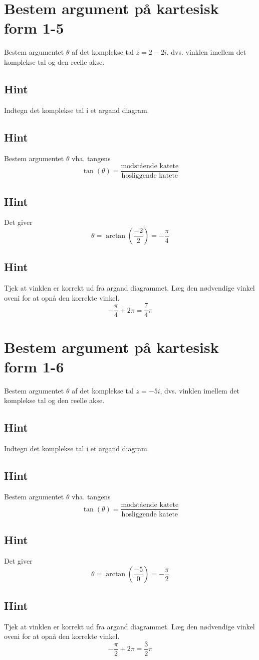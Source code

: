 \documentclass{article}
\newenvironment{exercise}[1]{\newpage\section{#1}}{}
\newcommand{\answerbox}[1]{\fbox{$#1$}}
\newcommand{\hint}{\subsection*{Hint}}
\begin{document}
\begin{exercise}{Bestem argument på kartesisk form 1-5}
	
	Bestem argumentet $\theta$ af det komplekse tal $z=2-2i$, dvs. vinklen imellem det komplekse tal og den reelle akse.
	
	\answerbox{ \frac{7}{4} \pi}
	
	
	\hint 
	
	Indtegn det komplekse tal i et argand diagram.
	
	
	\hint
	
	Bestem argumentet $\theta$ vha. tangens
	\[
	\tan(\theta)=\frac{\textrm{modstående katete}}{\textrm{hosliggende katete}}
	\]
	
	\hint 
	
	Det giver
	\[
	\theta = \arctan \left(\frac{-2}{2}\right) =- \frac{\pi}{4}
	\]
	
	\hint
	
	Tjek at vinklen er korrekt ud fra argand diagrammet. Læg den nødvendige vinkel oveni for at opnå den korrekte vinkel. 
	\[
	- \frac{\pi}{4} + 2 \pi = \frac{7}{4} \pi
	\]
	
\end{exercise}

\newpage

\begin{exercise}{Bestem argument på kartesisk form 1-6}
	
	Bestem argumentet $\theta$ af det komplekse tal $z=-5i$, dvs. vinklen imellem det komplekse tal og den reelle akse.
	
	\answerbox{\frac{3}{2} \pi }
	
	
	\hint 
	
	Indtegn det komplekse tal i et argand diagram.
	
	
	\hint
	
	Bestem argumentet $\theta$ vha. tangens
	\[
	\tan(\theta)=\frac{\textrm{modstående katete}}{\textrm{hosliggende katete}}
	\]
	
	\hint 
	
	Det giver
	\[
	\theta = \arctan \left(\frac{-5}{0}\right) = - \frac{\pi}{2}
	\]
	
	\hint
	
	Tjek at vinklen er korrekt ud fra argand diagrammet. Læg den nødvendige vinkel oveni for at opnå den korrekte vinkel. 
	\[
	- \frac{\pi}{2} + 2 \pi  = \frac{3}{2} \pi  	
	\]
	
	
\end{exercise}

\newpage
\end{document}
